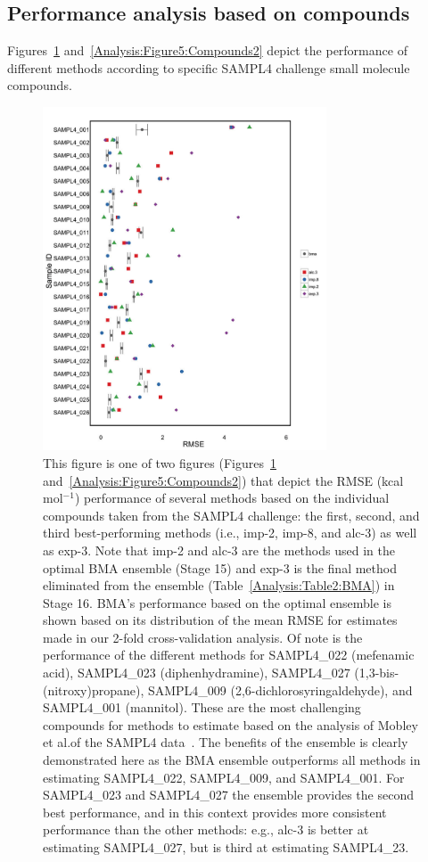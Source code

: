 \documentclass[journal=jpcbfk, manuscript=article]{achemso}
\newcommand{\+}[1]{\ensuremath{\mathbf{#1}}}
\begin{document}
\subsection{Performance analysis based on compounds}
\label{Results:BMA_Molecules}
Figures~\ref{Analysis:Figure4:Compounds1} and~\ref{Analysis:Figure5:Compounds2} depict the performance of different methods according to specific SAMPL4 challenge small molecule compounds.
\begin{figure}
	\centering
	\includegraphics[keepaspectratio,width=0.75\textwidth]{Figures/Rev2/error_bar_plot_no_best_split_1}
	\caption{This figure is one of two figures (Figures~\ref{Analysis:Figure4:Compounds1} and~\ref{Analysis:Figure5:Compounds2}) that depict the RMSE (kcal mol$^{-1}$) performance of several methods based on the individual compounds taken from the SAMPL4 challenge: the first, second, and third best-performing methods (i.e., imp-2, imp-8, and alc-3) as well as exp-3.
	Note that imp-2 and alc-3 are the methods used in the optimal BMA ensemble (Stage 15) and exp-3 is the final method eliminated from the ensemble (Table~\ref{Analysis:Table2:BMA}) in Stage 16.
	BMA's performance based on the optimal ensemble is shown based on its distribution of the mean RMSE for estimates made in our 2-fold cross-validation analysis.
	Of note is the performance of the different methods for SAMPL4\_022 (mefenamic acid), SAMPL4\_023 (diphenhydramine), SAMPL4\_027 (1,3-bis-(nitroxy)propane), SAMPL4\_009 (2,6-dichlorosyringaldehyde), and SAMPL4\_001 (mannitol).
	These are the most challenging compounds for methods to estimate based on the analysis of Mobley et al.\@ of the SAMPL4 data~\cite{Mobley:2014}.
	The benefits of the ensemble is clearly demonstrated here as the BMA ensemble outperforms all methods in estimating SAMPL4\_022, SAMPL4\_009, and SAMPL4\_001.
	For SAMPL4\_023 and SAMPL4\_027 the ensemble provides the second best performance, and in this context provides more consistent performance than the other methods: e.g., alc-3 is better at estimating SAMPL4\_027, but is third at estimating SAMPL4\_23.}
\label{Analysis:Figure4:Compounds1}
\end{figure}
\end{document}
